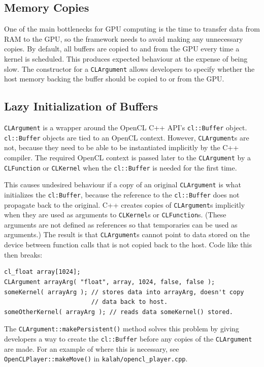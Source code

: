 \documentclass{article}
\begin{document}
\subsection{Memory Copies}
One of the main bottlenecks for GPU computing is the time to transfer data from RAM to the GPU, so the framework needs to avoid making any unnecessary copies. By default, all buffers are copied to and from the GPU every time a kernel is scheduled. This produces expected  behaviour at the expense of being slow. The constructor for a \texttt{CLArgument} allows developers to specify whether the host memory backing the buffer should be copied to or from the GPU.

\subsection{Lazy Initialization of Buffers}
\texttt{CLArgument} is a wrapper around the OpenCL C++ API's \texttt{cl::Buffer} object. \texttt{cl::Buffer} objects are tied to an OpenCL context. However, \texttt{CLArgument}s are not, because they need to be able to be instantiated implicitly by the C++ compiler. The required OpenCL context is passed later to the \texttt{CLArgument} by a \texttt{CLFunction} or \texttt{CLKernel} when the \texttt{cl::Buffer} is needed for the first time.

This causes undesired behaviour if a copy of an original \texttt{CLArgument} is what initializes the \texttt{cl:Buffer}, because the reference to the \texttt{cl::Buffer} does not propagate back to the original. C++ creates copies of \texttt{CLArgument}s implicitly when they are used as arguments to \texttt{CLKernel}s or \texttt{CLFunction}s. (These arguments are not defined as references so that temporaries can be used as arguments.) The result is that \texttt{CLArgument}s cannot point to data stored on the device between function calls that is not copied back to the host. Code like this then breaks:

\begin{lstlisting}
cl_float array[1024];
CLArgument arrayArg( "float", array, 1024, false, false );
someKernel( arrayArg ); // stores data into arrayArg, doesn't copy
                        // data back to host.
someOtherKernel( arrayArg ); // reads data someKernel() stored.
\end{lstlisting}

The \texttt{CLArgument::makePersistent()} method solves this problem by giving developers a way to create the \texttt{cl::Buffer} before any copies of the \texttt{CLArgument} are made. For an example of where this is necessary, see \texttt{OpenCLPlayer::makeMove()} in \texttt{kalah/opencl\_player.cpp}.
\end{document}
